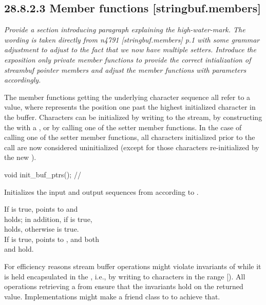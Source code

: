 \documentclass[ebook,11pt,article]{memoir}
\begin{document}
\subsection{28.8.2.3 Member functions [stringbuf.members]}

\textit{Provide a section introducing paragraph explaining the high-water-mark. The wording is taken directly from n4791 [stringbuf.members] p.1 with some grammar adjustment to adjust to the fact that we now have multiple setters. Introduce the exposition only private member functions  to provide the correct intialization of streambuf pointer members and adjust the  member functions with parameters accordingly. }

\begin{addedblock}
\pnum
The member functions getting the underlying character sequence all refer to a  value, 
 where
 represents the position one past the highest initialized character
in the buffer. Characters can be initialized by writing to the stream, by constructing
the  with a , or by calling one of 
the
 setter member functions. In the case of calling 
one of 
the
 setter member functions, all characters initialized prior to
the call are now considered uninitialized (except for those characters re-initialized
by the new ).  

\begin{itemdecl}
void init_buf_ptrs(); // \expos
\end{itemdecl}
\begin{itemdescr}
\pnum
\effects 
Initializes the input and output sequences from  according to .

\pnum
\ensures
If  is true, 
 points to  and \\ holds; 
in addition, if  is true, \\
 holds, 
otherwise  is true. \\
If  is true, 
 points to , 
and both \\ and  hold.

\pnum
\begin{note}
For efficiency reasons stream buffer operations might violate invariants of  while it is held encapsulated in the , i.e., by writing to characters in the range [). All operations retrieving a  from  ensure that the  invariants hold on the returned value. Implementations might make  a friend class to  to achieve that.
\end{note}
\end{itemdescr}
\end{addedblock}
\end{document}
